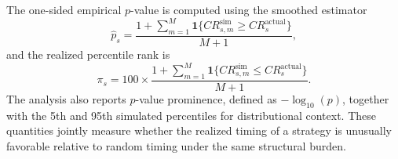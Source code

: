 \documentclass[preprint,12pt]{elsarticle}
\theoremstyle{definition}
\begin{document}
The one-sided empirical \(p\)-value is computed using the smoothed estimator
\begin{equation}
\hat{p}_s
=
\frac{1+\sum_{m=1}^{M}\mathbf{1}\{CR_{s,m}^{\mathrm{sim}}\ge CR_s^{\mathrm{actual}}\}}{M+1},
\end{equation}
and the realized percentile rank is
\begin{equation}
\pi_s
=
100\times
\frac{1+\sum_{m=1}^{M}\mathbf{1}\{CR_{s,m}^{\mathrm{sim}}\le CR_s^{\mathrm{actual}}\}}{M+1}.
\end{equation}
The analysis also reports \(p\)-value prominence, defined as \(-\log_{10}(p)\), together with the 5th and 95th simulated percentiles for distributional context. These quantities jointly measure whether the realized timing of a strategy is unusually favorable relative to random timing under the same structural burden.
\end{document}
